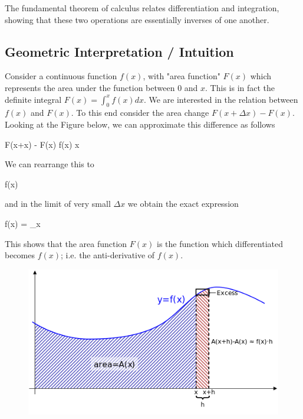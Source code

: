 

The fundamental theorem of calculus relates differentiation and integration, showing that these two operations are essentially inverses of one another.

\subsection{Geometric Interpretation / Intuition}

Consider a continuous function $f(x)$, with "area function" $F(x)$ which represents the area under the function between $0$ and $x$. This is in fact the definite integral $F(x) = \int_0^x f(x) dx$. We are interested in the relation between $f(x)$ and $F(x)$. To this end consider the area change $F(x+\Delta x) - F(x)$. Looking at the Figure below, we can approximate this difference as follows

\bee
F(x+\Delta x) - F(x) \approx f(x) \Delta x
\eee

We can rearrange this to

\bee
f(x) \approx {}
\eee

and in the limit of very small $\Delta x$ we obtain the exact expression

\bee
f(x) = \lim_{\Delta x } 
\eee

This shows that the area function $F(x)$ is the function which differentiated becomes $f(x)$; i.e. the anti-derivative of $f(x)$.

\begin{figure}[H]
	\includegraphics[scale=0.65]{images/fund_theorem_calculus.png}
\end{figure}


